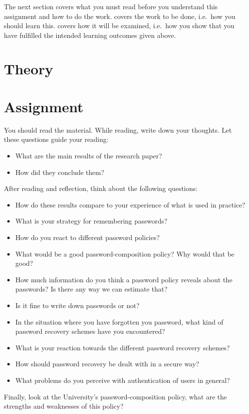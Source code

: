 The next section covers what you must read before you understand this 
assignment and how to do the work.
 covers the work to be done, i.e.~how you should learn this.
 covers how it will be examined, i.e.~how you show that you have 
fulfilled the intended learning outcomes given above.


\section{Theory}
\label{sec:theory}



\section{Assignment}
\label{sec:tasks}
You should read the material.
While reading, write down your thoughts.
Let these questions guide your reading:
\begin{itemize}
  \item What are the main results of the research paper?
  \item How did they conclude them?
\end{itemize}
After reading and reflection, think about the following questions:
\begin{itemize}
  \item How do these results compare to your experience of what is used in 
    practice?
  \item What is your strategy for remembering passwords?
  \item How do you react to different password policies?
  \item What would be a good password-composition policy?
    Why would that be good?
  \item How much information do you think a password policy reveals about the 
    passwords?
    Is there any way we can estimate that?
  \item Is it fine to write down passwords or not?
  \item In the situation where you have forgotten you password,
  	what kind of password recovery schemes have you encountered?
  \item What is your reaction towards the different password recovery schemes?  
  \item How should password recovery be dealt with in a secure way?
  \item What problems do you perceive with authentication of users in general?
\end{itemize}
Finally, look at the University's password-composition policy, what are the 
strengths and weaknesses of this policy?


